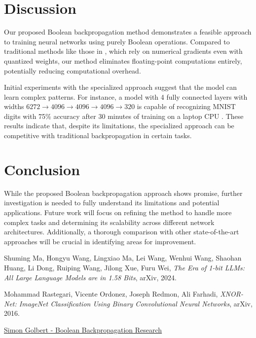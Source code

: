 \documentclass{article}
\theoremstyle{definition}
\theoremstyle{remark}
\begin{document}
\section{Discussion}
Our proposed Boolean backpropagation method demonstrates a feasible approach to training neural networks using purely Boolean operations. Compared to traditional methods like those in \cite{rastegari2016}, which rely on numerical gradients even with quantized weights, our method eliminates floating-point computations entirely, potentially reducing computational overhead.

Initial experiments with the specialized approach suggest that the model can learn complex patterns. For instance, a model with 4 fully connected layers with widths \( 6272 \rightarrow 4096 \rightarrow 4096 \rightarrow 4096 \rightarrow 320 \) is capable of recognizing MNIST digits with 75\% accuracy after 30 minutes of training on a laptop CPU \cite{bbp-research}. These results indicate that, despite its limitations, the specialized approach can be competitive with traditional backpropagation in certain tasks.

\section{Conclusion}
While the proposed Boolean backpropagation approach shows promise, further investigation is needed to fully understand its limitations and potential applications. Future work will focus on refining the method to handle more complex tasks and determining its scalability across different network architectures. Additionally, a thorough comparison with other state-of-the-art approaches will be crucial in identifying areas for improvement.

\begin{thebibliography}{9}
    Shuming Ma, Hongyu Wang, Lingxiao Ma, Lei Wang, Wenhui Wang, Shaohan Huang, Li Dong, Ruiping Wang, Jilong Xue, Furu Wei, \textit{The Era of 1-bit LLMs: All Large Language Models are in 1.58 Bits}, arXiv, 2024.

    Mohammad Rastegari, Vicente Ordonez, Joseph Redmon, Ali Farhadi, \textit{XNOR-Net: ImageNet Classification Using Binary Convolutional Neural Networks}, arXiv, 2016.

    \href{https://github.com/ababo/bbp-research/blob/main/notebook/mnist.ipynb}{Simon Golbert - Boolean Backpropagation Research}
\end{thebibliography}
\end{document}
